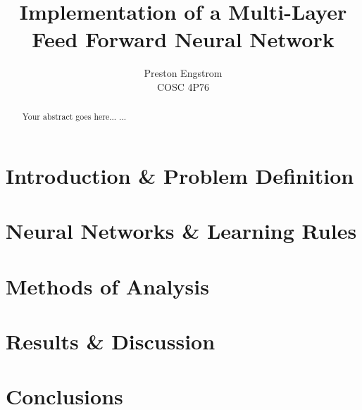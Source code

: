 \documentclass[10pt,a4paper]{report}
\begin{document}
\title{Implementation of a Multi-Layer Feed Forward Neural Network}
\date{}
\author{Preston Engstrom\\ COSC 4P76}
\maketitle
\newpage

\begin{abstract}
	Your abstract goes here...
	...
\end{abstract}

\section{Introduction \& Problem Definition}

\section{Neural Networks \& Learning Rules}

\section{Methods of Analysis}

\section{Results \& Discussion}

\section{Conclusions}
\end{document}

